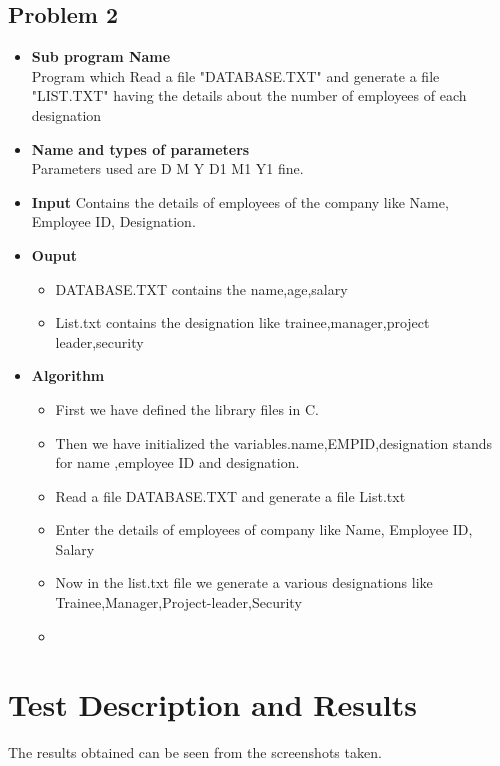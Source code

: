 \documentclass[11pt,a4paper]{article}
\begin{document}
\subsection{Problem 2}
\begin{itemize}


\item\textbf{Sub program Name}\\
{Program which Read a file "DATABASE.TXT" and generate a file "LIST.TXT" having the details about the number of employees of each designation}
\item\textbf{Name and types of parameters} \\
Parameters used are D M Y D1 M1 Y1 fine.
\item\textbf{Input}
Contains the details of employees of the company like Name, Employee ID, Designation.



 

\item\textbf{Ouput}
\begin{itemize}
\item DATABASE.TXT contains the name,age,salary
\item List.txt contains the designation like trainee,manager,project leader,security


\end{itemize}
\item\textbf{Algorithm}
\begin{itemize}
\item  First we have defined the library files in C.
\item  Then we have initialized the variables.name,EMPID,designation stands for name ,employee ID and designation.
\item Read a file DATABASE.TXT and generate a file List.txt 
\item Enter the details of employees of company like Name, Employee ID, Salary
\item Now in the list.txt file we generate a various designations like  Trainee,Manager,Project-leader,Security
\item 
\end{itemize}



\end{itemize}
\centering


\newpage
\centering





\newpage
\section{Test Description and Results}
\begin{flushleft}

The results obtained can be seen from the screenshots taken.
\end{flushleft}
\end{document}
